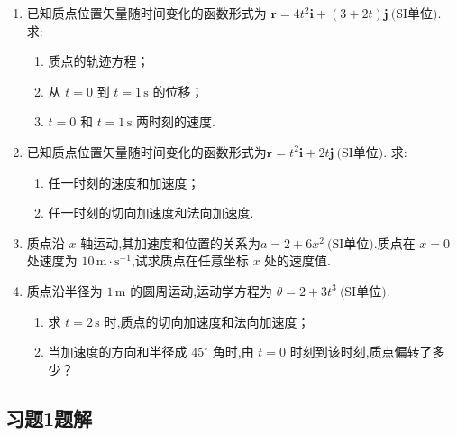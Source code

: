 \begin{enumerate}
\item[\textbf{1-18}] 已知质点位置矢量随时间变化的函数形式为
$\mathbf{r}=4t^2\mathbf{i}+(3+2t)\mathbf{j}\ \text{(SI单位)}.$
求:
\begin{enumerate}
	\item 质点的轨迹方程；
	\item 从 \(t=0\) 到 \(t=1\,\text{s}\) 的位移；
	\item \(t=0\) 和 \(t=1\,\text{s}\) 两时刻的速度.
\end{enumerate}


\item[\textbf{1-20}] 已知质点位置矢量随时间变化的函数形式为$\mathbf{r}=t^2\mathbf{i}+2t\mathbf{j}\ \text{(SI单位)}.$
求:
\begin{enumerate}
	\item 任一时刻的速度和加速度；
	\item 任一时刻的切向加速度和法向加速度.
\end{enumerate}

\item 质点沿 \(x\) 轴运动,其加速度和位置的关系为$a=2+6x^2\ \text{(SI单位)}.$质点在 \(x=0\) 处速度为 \(10\,\text{m}\cdot\text{s}^{-1}\),试求质点在任意坐标 \(x\) 处的速度值.

\item[\textbf{1-26}] 质点沿半径为 \(1\,\text{m}\) 的圆周运动,运动学方程为
$\theta=2+3t^3\ \text{(SI单位)}.$

\begin{enumerate}
	\item 求 \(t=2\,\text{s}\) 时,质点的切向加速度和法向加速度；
	\item 当加速度的方向和半径成 \(45^\circ\) 角时,由 \(t=0\) 时刻到该时刻,质点偏转了多少？
\end{enumerate}

\end{enumerate}

\subsection{习题1题解}

